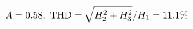 \documentclass[preview]{standalone}
\begin{document}
\begin{align*}
\special{dvisvgm:raw <g id='unique000'>}A=0.58,\ \text{THD}=\sqrt{H_2^2+H_3^2}/H_1=11.1\%\special{dvisvgm:raw </g>}
\end{align*}
\end{document}
